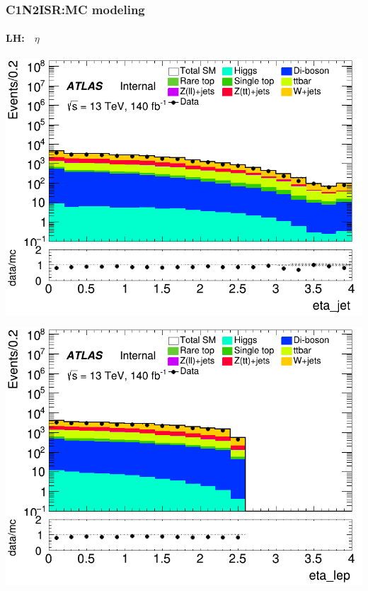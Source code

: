 \documentclass[usenames,dvipsnames]{beamer}
\begin{document}
\begin{frame}
\begin{minipage}{0.32\textwidth}
    \end{minipage}
\end{frame}

\begin{frame}
\frametitle{C1N2ISR:MC modeling}
\framesubtitle{LH:$\quad\eta$}
    \begin{minipage}{0.32\textwidth}
        \centering
        \includegraphics[width=\textwidth]{graphics/LH_met/LH_met_eta_jet.png}
    \end{minipage}
    \hfill
    \begin{minipage}{0.32\textwidth}
        \centering
        \includegraphics[width=\textwidth]{graphics/LH_met/LH_met_eta_lep.png}
    \end{minipage}
    \hfill
    \begin{minipage}{0.32\textwidth}

\end{minipage}
\end{frame}
\end{document}
